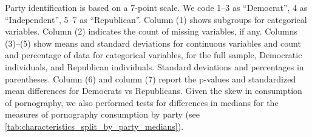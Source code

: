 \documentclass[12pt, letterpaper]{article}
\begin{document}
\begin{table}[ht]
{		Party identification is based on a 7-point scale. We code 1--3 as ``Democrat'', 4 as ``Independent'', 5--7 as ``Republican''.
		Column (1) shows subgroups for categorical variables.
		Column (2) indicates the count of missing variables, if any.
		Columns (3)--(5) show means and standard deviations for continuous variables and count and percentage of data for categorical variables, for the full sample, Democratic individuals, and Republican individuals.
		Standard deviations and percentages in parentheses.
		Column (6) and column (7) report the p-values and standardized mean differences for Democrats vs Republicans.
		Given the skew in consumption of pornography, we also performed tests for differences in medians for the measures of pornography consumption by party (see \cref{tab:characteristics_split_by_party_medians}).
	}
\end{table}
\end{document}
